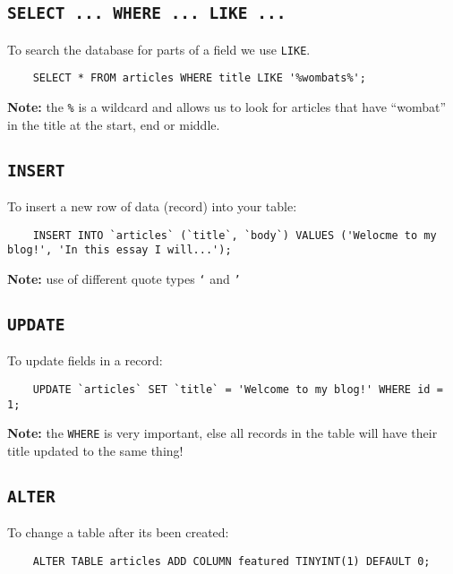 \subsection{\texttt{SELECT ... WHERE ... LIKE ...}}

To search the database for parts of a field we use \texttt{LIKE}.
\\

\begin{verbatim}
    SELECT * FROM articles WHERE title LIKE '%wombats%';
\end{verbatim}

\textbf{Note:} the \texttt{\%} is a wildcard and allows us to look for articles that have ``wombat'' in the title at the start, end or middle.

\subsection{\texttt{INSERT}}

To insert a new row of data (record) into your table:

\begin{verbatim}
    INSERT INTO `articles` (`title`, `body`) VALUES ('Welocme to my blog!', 'In this essay I will...');
\end{verbatim}

\textbf{Note:} use of different quote types \texttt{`} and \texttt{'}

\subsection{\texttt{UPDATE}}

To update fields in a record:

\begin{verbatim}
    UPDATE `articles` SET `title` = 'Welcome to my blog!' WHERE id = 1;
\end{verbatim}

\textbf{Note:} the \texttt{WHERE} is very important, else all records in the table will have their title updated to the same thing!

\subsection{\texttt{ALTER}}

To change a table after its been created:

\begin{verbatim}
    ALTER TABLE articles ADD COLUMN featured TINYINT(1) DEFAULT 0;
\end{verbatim}

